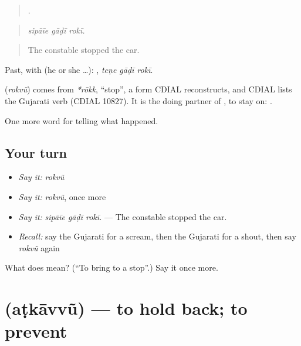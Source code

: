 \begin{quote}
  .
\end{quote}

\begin{quote}
\emph{sipāīe gāḍī rokī.}
\end{quote}

\begin{quote}
The constable stopped the car.
\end{quote}

Past, with  (he or she …):   , \emph{teṇe gāḍī rokī}.

\begin{cousinweb}
\textbf{} (\emph{rokvũ}) comes from \emph{*rōkk}, \textquotedblleft{}stop\textquotedblright{}, a form CDIAL reconstructs, and CDIAL lists the Gujarati verb (CDIAL 10827). It is the doing partner of \textbf{}, to stay on: \textbf{  }.
\end{cousinweb}

\begin{grammarlens}[title={What you've built}]
One more word for telling what happened.
\end{grammarlens}

\subsection*{Your turn}
\begin{itemize}
\raggedright
  \item \emph{Say it:} \emph{rokvũ}
  \item \emph{Say it:} \emph{rokvũ}, once more
  \item \emph{Say it:} \emph{sipāīe gāḍī rokī.} — The constable stopped the car.
  \item \emph{Recall:} say the Gujarati for a scream, then the Gujarati for a shout, then say \emph{rokvũ} again
\end{itemize}

\begin{tcolorbox}[breakable,colback=teal!4,colframe=teal!35!black,title={Before you move on}]
What does  mean? (\textquotedblleft{}To bring to a stop\textquotedblright{}.) Say it once more.
\end{tcolorbox}
\section[\texorpdfstring{\gu{અટકાવવું} (aṭkāvvũ)}{અટકાવવું (aṭkāvvũ)}]{ (aṭkāvvũ) — to hold back; to prevent}

